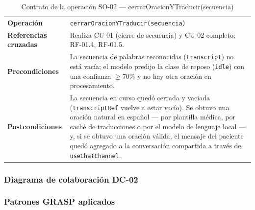 \begin{table}[H]
\centering
\begin{tabularx}{\textwidth}{@{}p{4.4cm} X@{}}
\toprule
\textbf{Operación} & \texttt{cerrarOracionYTraducir(secuencia)} \\
\textbf{Referencias cruzadas} & Realiza CU-01 (cierre de secuencia) y CU-02
completo; RF-01.4, RF-01.5. \\
\textbf{Precondiciones} & La secuencia de palabras reconocidas
(\texttt{transcript}) no está vacía; el modelo predijo la clase de reposo
(\texttt{idle}) con una confianza $\geq$70\% y no hay otra oración en
procesamiento. \\
\textbf{Postcondiciones} & La secuencia en curso quedó cerrada y vaciada
(\texttt{transcriptRef} vuelve a estar vacío). Se obtuvo una oración natural
en español --- por plantilla médica, por caché de traducciones o por el
modelo de lenguaje local --- y, si se obtuvo una oración válida, el mensaje
del paciente quedó agregado a la conversación compartida a través de
\texttt{useChatChannel}. \\
\bottomrule
\end{tabularx}
\caption{Contrato de la operación SO-02 --- cerrarOracionYTraducir(secuencia)}
\label{tab:col-contrato-so02}
\end{table}

\subsubsection{Diagrama de colaboración DC-02}


\subsubsection{Patrones GRASP aplicados}

